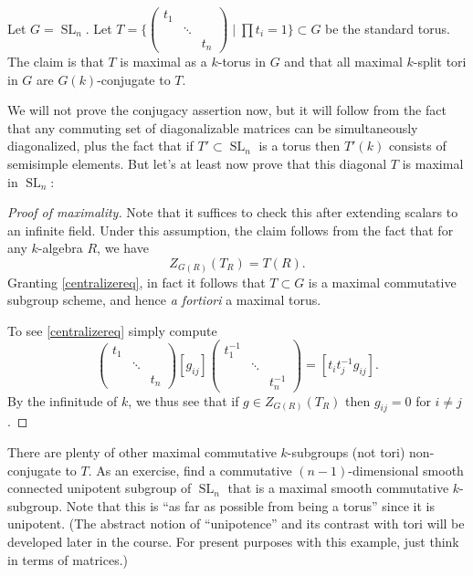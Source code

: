 \documentclass[10pt]{article}
\newcommand{\SL}{\operatorname{SL}}
\renewcommand{\(}{\left(}
\renewcommand{\)}{\right)}
\numberwithin{thm}{subsection}
\begin{document}
\begin{ex}Let $G=\SL_n$. Let $T=\{\(\begin{smallmatrix}t_1&&\\
&\ddots&\\
&&t_n\end{smallmatrix}\)\mid \prod t_i=1\}\subset G$ be the standard torus.
The claim is that
$T$ is maximal as a $k$-torus in $G$ and that all maximal $k$-split tori in $G$ are $G(k)$-conjugate to $T$.

We will not prove the conjugacy assertion now, but it will follow from the fact
that any commuting set of diagonalizable matrices can be simultaneously diagonalized, plus the fact that if $T'\subset\SL_n$ is a torus then $T'(k)$ consists of semisimple elements.
But let's at least now prove that this diagonal $T$ is maximal in $\SL_n$:
\begin{proof}[Proof of maximality]
Note that it suffices to check this after extending scalars to an infinite field.
 Under this assumption, the claim follows from the fact that for any $k$-algebra $R$, we have
\begin{equation*}\tag{$\star$}\label{centralizereq}Z_{G(R)}(T_R)=T(R).\end{equation*}
Granting \eqref{centralizereq}, in fact it follows that $T\subset G$ is a maximal commutative subgroup
scheme, and hence \textit{a fortiori} a maximal torus.

To see \eqref{centralizereq} simply compute
\[\(\begin{smallmatrix}t_1&&\\ &\ddots&\\  &&t_n\end{smallmatrix}\)[g_{ij}]\(\begin{smallmatrix}t_1^{-1}&&\\ &\ddots&\\ &&t_n^{-1}\end{smallmatrix}\)=[t_it_j^{-1}g_{ij}].\]
By the infinitude of $k$, we thus see that if $g\in Z_{G(R)}(T_R)$ then $g_{ij}=0$ for $i\neq j$.
\end{proof}
\end{ex}

\begin{rem}There are plenty of other maximal commutative $k$-subgroups (not tori) non-conjugate to $T$.
As an exercise, find a commutative $(n-1)$-dimensional 
smooth connected unipotent subgroup of $\SL_n$ that is a maximal 
smooth commutative $k$-subgroup. Note that this is ``as far as possible from being a torus'' since it is unipotent.
(The abstract notion of ``unipotence'' and its contrast with tori will be developed later in the course.
For present purposes with this example, just think in terms of matrices.)
\end{rem}
\end{document}

